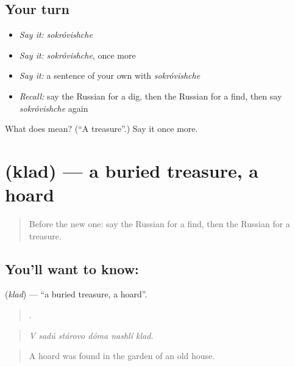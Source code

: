 \subsection*{Your turn}
\begin{itemize}
\raggedright
  \item \emph{Say it:} \emph{sokróvishche}
  \item \emph{Say it:} \emph{sokróvishche}, once more
  \item \emph{Say it:} a sentence of your own with \emph{sokróvishche}
  \item \emph{Recall:} say the Russian for a dig, then the Russian for a find, then say \emph{sokróvishche} again
\end{itemize}

\begin{tcolorbox}[breakable,colback=teal!4,colframe=teal!35!black,title={Before you move on}]
What does  mean? (\textquotedblleft{}A treasure\textquotedblright{}.) Say it once more.
\end{tcolorbox}
\section[\texorpdfstring{\ru{клад} (klad)}{клад (klad)}]{ (klad) — a buried treasure, a hoard}

\label{lesson:RU-C327-klad}



\begin{quote}
Before the new one: say the Russian for a find, then the Russian for a treasure.
\end{quote}

\subsection*{You'll want to know: }
\textbf{} (\emph{klad}) — \textquotedblleft{}a buried treasure, a hoard\textquotedblright{}.

\begin{quote}
     .
\end{quote}

\begin{quote}
\emph{V sadú stárovo dóma nashlí klad.}
\end{quote}

\begin{quote}
A hoard was found in the garden of an old house.
\end{quote}

